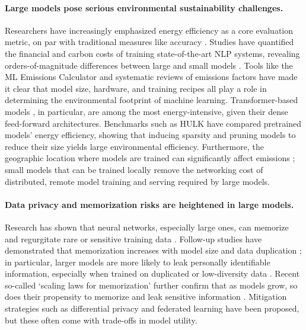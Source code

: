 \paragraph{Large models pose serious environmental sustainability challenges.} Researchers have increasingly emphasized energy efficiency as a core evaluation metric, on par with traditional measures like accuracy \citep{schwartz2020greenai}. Studies have quantified the financial and carbon costs of training state-of-the-art NLP systems, revealing orders-of-magnitude differences between large and small models \citep{strubell2019energy}. Tools like the ML Emissions Calculator \citep{lacoste2019quantifying} and systematic reviews of emissions factors \citep{luccioni2023counting} have made it clear that model size, hardware, and training recipes all play a role in determining the environmental footprint of machine learning. Transformer-based models \citep{vaswani2017attention}, in particular, are among the most energy-intensive, given their dense feed-forward architectures. Benchmarks such as HULK \citep{zhou2021hulk} have compared pretrained models' energy efficiency, showing that inducing sparsity and pruning models to reduce their size yields large environmental efficiency. Furthermore, the geographic location where models are trained can significantly affect emissions \citep{patterson2021carbon}; small models that can be trained locally remove the networking cost of distributed, remote model training and serving required by large models. 


\paragraph{Data privacy and memorization risks are heightened in large models.} Research has shown that neural networks, especially large ones, can memorize and regurgitate rare or sensitive training data \citep{feldman2020neural, carlini2019secret}. Follow-up studies have demonstrated that memorization increases with model size and data duplication \citep{carlini2021extracting, carlini2022quantifying}; in particular, larger models are more likely to leak personally identifiable information, especially when trained on duplicated or low-diversity data \citep{huang2022large, neel2023privacy}. Recent so-called `scaling laws for memorization' further confirm that as models grow, so does their propensity to memorize and leak sensitive information \citep{lu2024scaling, biderman2023emergent, kiyomaru2024comprehensive}. Mitigation strategies such as differential privacy \citep{dwork2006calibrating} and federated learning \citep{mcmahan2017communication} have been proposed, but these often come with trade-offs in model utility.%

